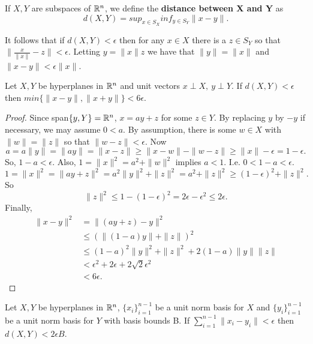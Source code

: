 \begin{definition}
If $X,Y$ are subspaces of $\mathbb R^n$, we define the {\bf distance between X and Y} as
\[ d(X,Y)=sup_{x\in S_X}inf_{y\in S_Y}\|x-y\|.\]
\end{definition}

It follows that if $d(X,Y)<\epsilon$ then for any $x\in X$ there is a $z\in S_Y$ so that $\|\frac{x}{\|x\|}-z\|<\epsilon$.
Letting $y=\|x\|z$ we have that $\|y\|=\|x\|$ and $\|x-y\|<\epsilon \|x\|$.

\begin{proposition}\label{P1}
Let $X,Y$ be hyperplanes in $\mathbb R^n$ and unit vectors $x\perp X,\ y\perp Y$. If $d(X,Y)<\epsilon$ then $min\{\|x-y\|,\|x+y\|\}<6\epsilon.$
\end{proposition}

\begin{proof}
Since span$\{y,Y\}=\mathbb R^n$, $x=ay+z$ for some $z\in Y$. By replacing $y$ by $-y$ if necessary, we may assume $0<a$.
By assumption, there is some $w\in X$ with $\|w\|=\|z\|$ so that $\|w-z\|< \epsilon$. Now
\[a = a\|y\|=\|ay\|=\|x-z\|\ge \|x-w\|-\|w-z\| \ge \|x\|-\epsilon=1-\epsilon.\]
So, $1-a< \epsilon$. Also, $1=\|x\|^2=a^2+\|w\|^2$ implies $a<1$. I.e. $0<1-a<\epsilon$.
\[1=\|x\|^2=\|ay+z\|^2= a^2\|y\|^2+\|z\|^2=a^2+\|z\|^2\ge (1-\epsilon)^2+\|z\|^2.\]
So
\[ \|z\|^2\le 1-(1-\epsilon)^2=2\epsilon-\epsilon^2\le 2\epsilon.\]
Finally,
\begin{align*}
 \|x-y\|^2&=\|(ay+z)-y\|^2\\
 &\le (\|(1-a)y\|+\|z\|)^2\\
 &\le (1-a)^2\|y\|^2+\|z\|^2+2(1-a)\|y\|\|z\|\\
 &< \epsilon^2+2\epsilon+2 \sqrt{2}\epsilon^2\\
 &<6\epsilon.
\end{align*}
\end{proof}

\begin{lemma}\label{L1}
Let $X,Y$ be hyperplanes in $\mathbb R^n$, $\{x_i\}_{i=1}^{n-1}$ be a unit norm basis for $X$ and
$\{y_i\}_{i=1}^{n-1}$ be a unit norm basis for $Y$ with basis bounds B. If
$\sum_{i=1}^{n-1}\|x_i-y_i\|<\epsilon$ then $d(X,Y)<2\epsilon B$.
\end{lemma}


